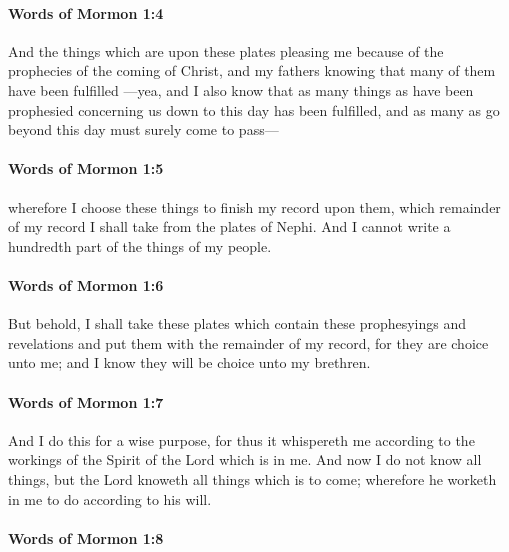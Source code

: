 		\paragraph{Words of Mormon 1:4} %
			\label{WORDSOFMORMON-1-4}

			And the things which are upon these plates pleasing me
			because of the prophecies of the coming of Christ,
			and my fathers knowing that many of them have been fulfilled
			---yea, and I also know that as many things as have been prophesied
			concerning us down to this day has been fulfilled,
			and as many as go beyond this day must surely come to pass---

		\paragraph{Words of Mormon 1:5} %
			\label{WORDSOFMORMON-1-5}

			wherefore I choose these things to finish my record upon them,
			which remainder of my record I shall take from the plates of Nephi.
			And I cannot write a hundredth part of the things of my people.

		\paragraph{Words of Mormon 1:6} %
			\label{WORDSOFMORMON-1-6}

			But behold, I shall take these plates
			which contain these prophesyings and revelations
			and put them with the remainder of my record,
			for they are choice unto me;
			and I know they will be choice unto my brethren.

		\paragraph{Words of Mormon 1:7} %
			\label{WORDSOFMORMON-1-7}

			And I do this for a wise purpose,
			for thus it whispereth me
			according to the workings of the Spirit of the Lord which is in me.
			And now I do not know all things,
			but the Lord knoweth all things which is to come;
			wherefore he worketh in me to do according to his will.

		\paragraph{Words of Mormon 1:8} %
			\label{WORDSOFMORMON-1-8}

